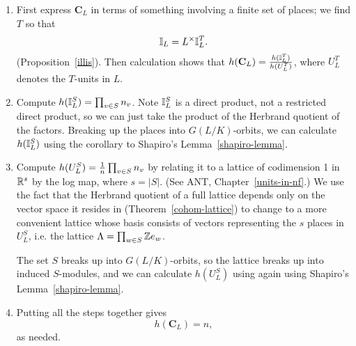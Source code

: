 \begin{enumerate}
\item
First express $\mathbf C_L$ in terms of something involving a finite set of places; we find $T$ so that
\[
\mathbb{I}_L=L^{\times}\mathbb{I}_L^T.
\]
(Proposition~\ref{illis}). Then calculation shows that $h(\mathbf C_L)=\frac{h(\mathbb{I}_L^T)}{h(U_L^T)}$, where $U_L^T$ denotes the $T$-units in $L$.
\item Compute $h(\mathbb{I}_L^S)=\prod_{v\in S}n_v$. Note $\mathbb{I}_L^S$ is a direct product, not a restricted direct product, so we can just take the product of the Herbrand quotient of the factors. Breaking up the places into $G(L/K)$-orbits, we can calculate $h(\mathbb{I}_L^S)$ using the corollary to Shapiro's Lemma~\ref{shapiro-lemma}.
\item Compute $h(U_L^S)=\frac{1}{n}\prod_{v\in S}n_v$ by relating it to a lattice of codimension 1 in $\mathbb{R}^s$ by the log map, where $s=|S|$. (See ANT, Chapter~\ref{units-in-nf}.)
We use the fact that the Herbrand quotient of a full lattice depends only on the vector space it resides in (Theorem~\ref{cohom-lattice}) to change to a more convenient lattice whose basis consists of vectors representing the $s$ places in $U_L^S$, i.e. the lattice $\Lambda=\prod_{w\in S} \mathbb{Z} e_w$. 

The set $S$ breaks up into $G(L/K)$-orbits, so the lattice breaks up into induced $S$-modules, and we can calculate $h(U_L^S)$ using again using Shapiro's Lemma~\ref{shapiro-lemma}.
\item
Putting all the steps together gives
\[
h(\mathbf C_L)=n,
\]
as needed.
%
\end{enumerate}
